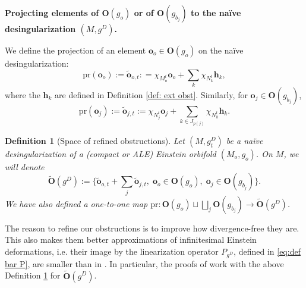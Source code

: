 \documentclass[11pt,reqno]{amsart}
\numberwithin{equation}{section}
\newcommand{\pr}{\mathrm{pr}}
\newtheorem{defn}[thm]{Definition}
\theoremstyle{definition}
\theoremstyle{remark}
\begin{document}
\textbf{Projecting elements of $\mathbf{O}(g_o)$ or of $\mathbf{O}(g_{b_j})$ to the naïve desingularization $(M,g^D)$.}

We define the projection of an element $\mathbf{o}_o\in \mathbf{O}(g_o)$ on the naïve desingularization:
$$\pr(\mathbf{o}_o) := \tilde{\mathbf{o}}_{o,t}: = \chi_{M_o^t}\mathbf{o}_o+\sum_{k} \chi_{N_k^t}\mathbf{h}_k, $$
where the $\mathbf{h}_k$ are defined in Definition \ref{def: ext obst}. Similarly, for $\mathbf{o}_{j}\in \mathbf{O}(g_{b_j})$,  
$$\pr(\mathbf{o}_j) := \tilde{\mathbf{o}}_{j,t} := \chi_{N_j^t}\mathbf{o}_j+\sum_{k\in J_{p(j)}} \chi_{N_k^t}\mathbf{h}_k. $$

\begin{defn}[Space of refined obstructions]\label{def obst tronq}
    Let $(M,g^D_{t})$ be a naïve desingularization of a (compact or ALE) Einstein orbifold $(M_o,g_o)$. On $M$, we will denote 
    $$\tilde{\mathbf{O}}(g^D):=\Big\{\tilde{\mathbf{o}}_{o,t} + \sum_j\tilde{\mathbf{o}}_{j,t}, \;\mathbf{o}_o\in \mathbf{O}(g_o), \; \mathbf{o}_j\in \mathbf{O}(g_{b_j})\Big\}.$$ 
    We have also defined a one-to-one map $\pr: \mathbf{O}(g_o)\sqcup\bigsqcup_j\mathbf{O}(g_{b_j})\to \tilde{\mathbf{O}}(g^D)$.
\end{defn}

The reason to refine our obstructions is to improve how divergence-free they are. This also makes them better approximations of infinitesimal Einstein deformations, i.e. their image by the linearization operator $P_{g^D}$, {defined in \eqref{eq:def bar P}}, are smaller than in \cite[Lemma 4.5]{ozu2}. In particular, the proofs of \cite{ozu2} work with the above Definition \ref{def obst tronq} for $\tilde{\mathbf{O}}(g^D)$.
\end{document}
